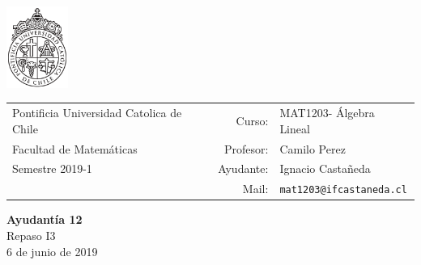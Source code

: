 \documentclass[12pt]{article}
\makeatletter
\newcommand{\ayudantia}{{\sc Ayudantía 12}}
\newcommand{\tituloayu}{Repaso I3}
\newcommand{\fecha}{6 de junio de 2019}
\newcommand{\sigla}{MAT1203}
\newcommand{\nombre}{Álgebra Lineal}
\newcommand{\profesor}{Camilo Perez}
\newcommand{\ano}{2019}
\newcommand{\semestre}{1}
\newcommand{\mail}{mat1203@ifcastaneda.cl}
\makeatother
\begin{document}
\thispagestyle{empty}

\begin{minipage}{2cm}
	\includegraphics[width=2cm]{../../../../img/logo.pdf}
	\vspace{0.5cm}
\end{minipage}
\begin{minipage}{\linewidth}
	\begin{tabular}{lrl}
		{\scriptsize\sc Pontificia Universidad Catolica de Chile} & \hspace*{0.7in}Curso: &
		\sigla  - \nombre\\
		{\sc Facultad de Matemáticas}&
		Profesor: & \profesor \\
		{\sc Semestre \ano-\semestre} & Ayudante: & {Ignacio Castañeda}\\
		& {Mail:} & \texttt{\mail}
	\end{tabular}
\end{minipage}

\vspace{-10mm}
\begin{center}
	{\LARGE\bf \ayudantia}\\
	\vspace{0.1cm}
	{\tituloayu}\\
	\vspace{0.1cm}
	\fecha\\
	\vspace{0.4cm}
\end{center}
\end{document}
